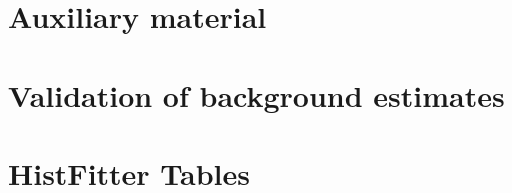 \documentclass{outhesis}
\begin{document}
\clearpage

\appendix

\chapter{Auxiliary material}\label{chap:aux}
\graphicspath{{figures/app/}}



\chapter{Validation of background estimates}\label{chap:app.bkg.val}
\graphicspath{{figures/app/}}
%

\chapter{HistFitter Tables}\label{app:HFtables}
\graphicspath{{figures/app/}}


%


\backmatter
\end{document}
